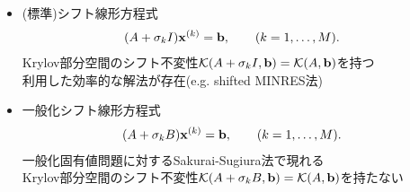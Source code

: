 

\begin{itemize}
	\item (標準)シフト線形方程式
		\begin{align}
			(A + \sigma_{k}I)\vb{x}^{(k)} &= \vb{b}, \qquad (k=1,\dots,M).
		\end{align}
		Krylov部分空間のシフト不変性$\mathcal{K}(A+\sigma_kI, \vb{b}) = \mathcal{K}(A, \vb{b})$を持つ\\
		\myitem 利用した効率的な解法が存在(e.g. shifted MINRES法)
	\vspace{0.2\baselineskip}
	\item 一般化シフト線形方程式
		\begin{align}
			(A + \sigma_{k}B)\vb{x}^{(k)} &= \vb{b}, \qquad (k=1,\dots,M).
		\end{align}
		一般化固有値問題に対するSakurai-Sugiura法で現れる\\
		Krylov部分空間のシフト不変性$\mathcal{K}(A+\sigma_kB, \vb{b}) = \mathcal{K}(A, \vb{b})$を持たない\\
\end{itemize}
